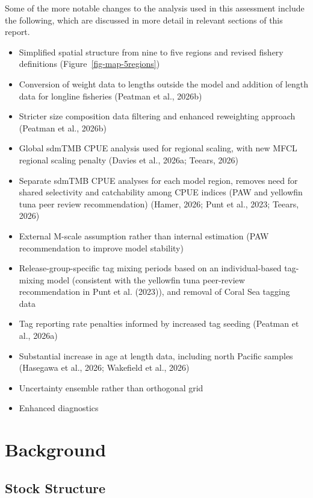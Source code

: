 \documentclass[
  english,
  a4paper,
  a4paper,
  11pt]{SCreport}
\begin{document}
Some of the more notable changes to the analysis used in this assessment
include the following, which are discussed in more detail in relevant
sections of this report.

\begin{itemize}
\item
  Simplified spatial structure from nine to five regions and revised
  fishery definitions (Figure~\ref{fig-map-5regions})
\item
  Conversion of weight data to lengths outside the model and addition of
  length data for longline fisheries (Peatman et al., 2026b)
\item
  Stricter size composition data filtering and enhanced reweighting
  approach (Peatman et al., 2026b)
\item
  Global sdmTMB CPUE analysis used for regional scaling, with new MFCL
  regional scaling penalty (Davies et al., 2026a; Teears, 2026)
\item
  Separate sdmTMB CPUE analyses for each model region, removes need for
  shared selectivity and catchability among CPUE indices (PAW and
  yellowfin tuna peer review recommendation) (Hamer, 2026; Punt et al.,
  2023; Teears, 2026)
\item
  External M-scale assumption rather than internal estimation (PAW
  recommendation to improve model stability)
\item
  Release-group-specific tag mixing periods based on an individual-based
  tag-mixing model (consistent with the yellowfin tuna peer-review
  recommendation in Punt et al. (2023)), and removal of Coral Sea
  tagging data
\item
  Tag reporting rate penalties informed by increased tag seeding
  (Peatman et al., 2026a)
\item
  Substantial increase in age at length data, including north Pacific
  samples (Hasegawa et al., 2026; Wakefield et al., 2026)
\item
  Uncertainty ensemble rather than orthogonal grid
\item
  Enhanced diagnostics
\end{itemize}

\section{Background}\label{sec-background}

\subsection{Stock Structure}\label{sec-stock-structure}
\end{document}
